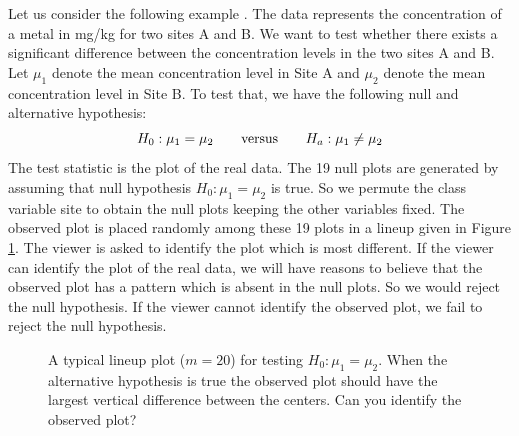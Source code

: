 \documentclass[12]{report}
\begin{document}
Let us consider the following example . The data represents the concentration of a metal in mg/kg for two sites A and B.
We want to test whether there exists a significant difference between the concentration levels in the two sites A and B. Let $\mu_1$ denote the mean concentration level in Site A and $\mu_2$ denote the mean concentration level in Site B. To test that, we have the following null and alternative hypothesis:
\[
H_0: \mu_1 = \mu_2 \qquad \hbox{versus} \qquad H_a: \mu_1 \ne \mu_2
\]
The test statistic is the plot of the real data. The 19 null plots are generated by assuming that null hypothesis $H_0: \mu_1 =  \mu_2$ is true. So we permute the class variable site to obtain the null plots keeping the other variables fixed. The observed plot is placed randomly among these 19 plots in a lineup given in Figure \ref{lineup}. The viewer is asked to identify the plot which is most different. If the viewer can identify the plot of the real data, we will have reasons to believe that the observed plot has a pattern which is absent in the null plots. So we would reject the null hypothesis. If the viewer cannot identify the observed plot, we fail to reject the null hypothesis. \\

\begin{figure}[hbtp]
   \centering
      \caption{A typical lineup plot ($m = 20$) for testing $H_0: \mu_1 =  \mu_2$. 
      When the alternative hypothesis is true the observed plot should have the largest vertical difference between the centers. Can you identify the observed plot?}
      \label{lineup}
\end{figure}
\end{document}
